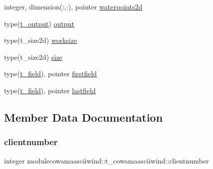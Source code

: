 \begin{DoxyCompactItemize}
integer, dimension(\+:,\+:), pointer \mbox{\hyperlink{structmodulecowamaasciiwind_1_1t__cowamaasciiwind_a9abb3683fcfa413283dd87b6e7c9bfbb}{waterpoints2d}}
\item 
type(\mbox{\hyperlink{structmodulecowamaasciiwind_1_1t__output}{t\+\_\+output}}) \mbox{\hyperlink{structmodulecowamaasciiwind_1_1t__cowamaasciiwind_a20ba01fd2aa89f65da820c76db246b91}{output}}
\item 
type(t\+\_\+size2d) \mbox{\hyperlink{structmodulecowamaasciiwind_1_1t__cowamaasciiwind_a3f6cd60b4995a39dfcb89db63c46700e}{worksize}}
\item 
type(t\+\_\+size2d) \mbox{\hyperlink{structmodulecowamaasciiwind_1_1t__cowamaasciiwind_a52ac1d136f54342f687aabf50103b9a7}{size}}
\item 
type(\mbox{\hyperlink{structmodulecowamaasciiwind_1_1t__field}{t\+\_\+field}}), pointer \mbox{\hyperlink{structmodulecowamaasciiwind_1_1t__cowamaasciiwind_a914b3dd74eebf978ac807398722ab807}{firstfield}}
\item 
type(\mbox{\hyperlink{structmodulecowamaasciiwind_1_1t__field}{t\+\_\+field}}), pointer \mbox{\hyperlink{structmodulecowamaasciiwind_1_1t__cowamaasciiwind_a6bd9216ec7d748307ca12fccc2301843}{lastfield}}
\end{DoxyCompactItemize}


\subsection{Member Data Documentation}
\mbox{\label{structmodulecowamaasciiwind_1_1t__cowamaasciiwind_a5afff8a3c199ec12eec779775228a30f}} 
\subsubsection{\texorpdfstring{clientnumber}{clientnumber}}
{\footnotesize\ttfamily integer modulecowamaasciiwind\+::t\+\_\+cowamaasciiwind\+::clientnumber\hspace{0.3cm}{\ttfamily [private]}}

\mbox{\label{structmodulecowamaasciiwind_1_1t__cowamaasciiwind_a98c6c04853d7ca2a176322ae4757c43f}} 
